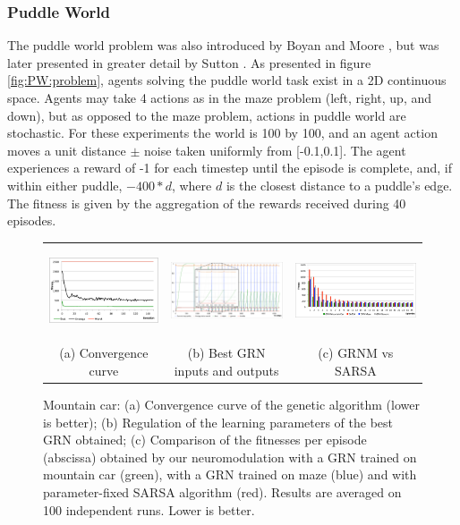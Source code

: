 
\subsubsection{Puddle World}

The puddle world problem was also introduced by Boyan and Moore \cite{Boyan1995}, but was later presented in greater detail by Sutton \cite{sutton1996generalization}. As presented in figure \ref{fig:PW:problem}, agents solving the puddle world task exist in a 2D continuous space. Agents may take 4 actions as in the maze problem (left, right, up, and down), but as opposed to the maze problem, actions in puddle world are stochastic. For these experiments the world is 100 by 100, and an agent action moves a unit distance $\pm$ noise taken uniformly from [-0.1,0.1]. The agent experiences a reward of -1 for each timestep until the episode is complete, and, if within either puddle, $-400*d$, where $d$ is the closest distance to a puddle's edge. The fitness is given by the aggregation of the rewards received during 40 episodes.


\begin{figure}[t!]
\center
\begin{tabular}{ccc}
\includegraphics[height=2.7cm]{MC_convergence.pdf} &
\includegraphics[height=2.7cm]{MC_GRNBehavior.pdf} &
\includegraphics[height=2.7cm]{MC_GRNvsSARSA.pdf}\\
(a) Convergence curve &
(b) Best GRN inputs and outputs &
(c) GRNM vs SARSA
\end{tabular}
\caption{Mountain car: (a) Convergence curve of the genetic algorithm (lower is better); (b) Regulation of the learning parameters of the best GRN obtained; (c) Comparison of the fitnesses per episode (abscissa) obtained by our neuromodulation with a GRN trained on mountain car (green), with a GRN trained on maze (blue) and with parameter-fixed SARSA algorithm (red). Results are averaged on 100 independent runs. Lower is better.}\label{fig:MC:Results}
\end{figure}

